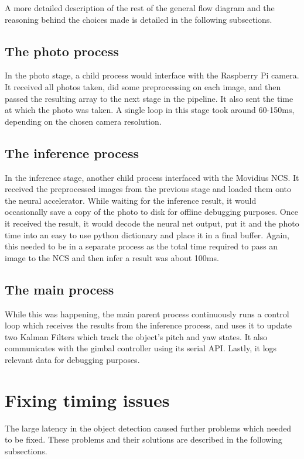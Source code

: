 A more detailed description of the rest of the general flow diagram and the reasoning behind the choices made is detailed in the following subsections.

\subsection{The photo process}
In the photo stage, a child process would interface with the Raspberry Pi camera. It received all photos taken, did some preprocessing on each image, and then passed the resulting array to the next stage in the pipeline. It also sent the time at which the photo was taken. A single loop in this stage took around 60-150ms, depending on the chosen camera resolution.

\subsection{The inference process}
In the inference stage, another child process interfaced with the Movidius NCS. It received the preprocessed images from the previous stage and loaded them onto the neural accelerator. While waiting for the inference result, it would occasionally save a copy of the photo to disk for offline debugging purposes. Once it received the result, it would decode the neural net output, put it and the photo time into an easy to use python dictionary and place it in a final buffer. Again, this needed to be in a separate process as the total time required to pass an image to the NCS and then infer a result was about 100ms.

\subsection{The main process}
While this was happening, the main parent process continuously runs a control loop which receives the results from the inference process, and uses it to update two Kalman Filters which track the object's pitch and yaw states. It also communicates with the gimbal controller using its serial API. Lastly, it logs relevant data for debugging purposes.



\section{Fixing timing issues}
The large latency in the object detection caused further problems which needed to be fixed. These problems and their solutions are described in the following subsections.

